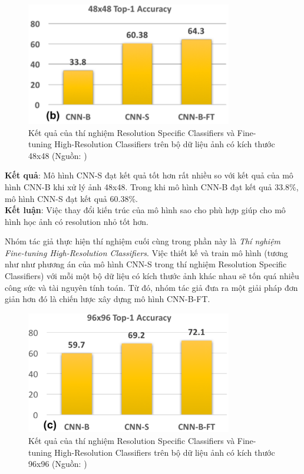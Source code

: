 {    \begin{figure}[H]
        \centering
        \includegraphics[width=9cm] {images/snip_res_spec_cls}
        \caption{Kết quả của thí nghiệm Resolution Specific Classifiers và Fine-tuning High-Resolution Classifiers trên bộ dữ liệu ảnh có kích thước 48x48 (Nguồn: \cite{singh2018analysis})}
        \label{fig:snip_res_spec_cls}
    \end{figure}

    \noindent
    \textbf{Kết quả}:
    Mô hình CNN-S đạt kết quả tốt hơn rất nhiều so với kết quả của mô hình CNN-B khi xử lý ảnh 48x48.
    Trong khi mô hình CNN-B đạt kết quả 33.8\%, mô hình CNN-S đạt kết quả 60.38\%. \\
    \textbf{Kết luận}:
    Việc thay đổi kiến trúc của mô hình sao cho phù hợp giúp cho mô hình học ảnh có resolution nhỏ tốt hơn.

    \noindent
    Nhóm tác giả thực hiện thí nghiệm cuối cùng trong phần này là \textit{Thí nghiệm Fine-tuning High-Resolution Classifiers}.
    Việc thiết kế và train mô hình (tương như như phương án của mô hình CNN-S trong thí nghiệm Resolution Specific Classifiers) với mỗi một bộ dữ liệu có kích thước ảnh khác nhau sẽ tốn quá nhiều công sức và tài nguyên tính toán.
    Từ đó, nhóm tác giả đưa ra một giải pháp đơn giản hơn đó là chiến lược xây dựng mô hình CNN-B-FT.

    \begin{figure}[H]
        \centering
        \includegraphics[width=9cm] {images/snip_res_spec_cls_96}
        \caption{Kết quả của thí nghiệm Resolution Specific Classifiers và Fine-tuning High-Resolution Classifiers trên bộ dữ liệu ảnh có kích thước 96x96 (Nguồn: \cite{singh2018analysis})}
        \label{fig:snip_res_spec_cls_96}
    \end{figure}

}
